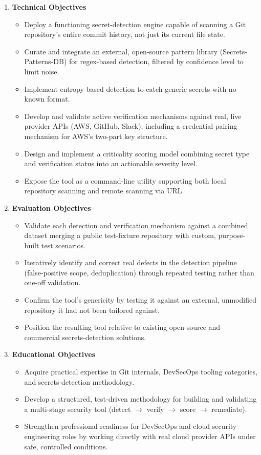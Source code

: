 \documentclass[12pt]{article}
\begin{document}
\begin{enumerate}
    \item \textbf{Technical Objectives}
    \begin{itemize}
        \item Deploy a functioning secret-detection engine capable of scanning a Git repository's entire commit history, not just its current file state.
        \item Curate and integrate an external, open-source pattern library (Secrets-Patterns-DB) for regex-based detection, filtered by confidence level to limit noise.
        \item Implement entropy-based detection to catch generic secrets with no known format.
        \item Develop and validate active verification mechanisms against real, live provider APIs (AWS, GitHub, Slack), including a credential-pairing mechanism for AWS's two-part key structure.
        \item Design and implement a criticality scoring model combining secret type and verification status into an actionable severity level.
        \item Expose the tool as a command-line utility supporting both local repository scanning and remote scanning via URL.
    \end{itemize}

    \item \textbf{Evaluation Objectives}
    \begin{itemize}
        \item Validate each detection and verification mechanism against a combined dataset merging a public test-fixture repository with custom, purpose-built test scenarios.
        \item Iteratively identify and correct real defects in the detection pipeline (false-positive scope, deduplication) through repeated testing rather than one-off validation.
        \item Confirm the tool's genericity by testing it against an external, unmodified repository it had not been tailored against.
        \item Position the resulting tool relative to existing open-source and commercial secrets-detection solutions.
    \end{itemize}

    \item \textbf{Educational Objectives}
    \begin{itemize}
        \item Acquire practical expertise in Git internals, DevSecOps tooling categories, and secrets-detection methodology.
        \item Develop a structured, test-driven methodology for building and validating a multi-stage security tool (detect $\rightarrow$ verify $\rightarrow$ score $\rightarrow$ remediate).
        \item Strengthen professional readiness for DevSecOps and cloud security engineering roles by working directly with real cloud provider APIs under safe, controlled conditions.
    \end{itemize}
\end{enumerate}
\end{document}
